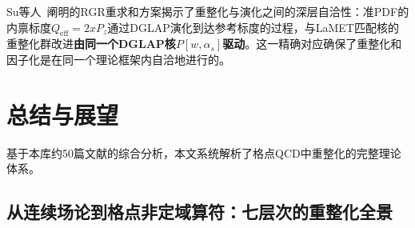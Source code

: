 \documentclass[12pt,a4paper]{ctexart}
\theoremstyle{definition}
\begin{document}
Su等人~\cite{Su2023RGR}阐明的RGR重求和方案揭示了重整化与演化之间的深层自洽性：准PDF的内禀标度$Q_{\text{eff}} = 2xP_z$通过DGLAP演化到达参考标度的过程，与LaMET匹配核的重整化群改进\textbf{由同一个DGLAP核$P[w,\alpha_s]$驱动}。这一精确对应确保了重整化和因子化是在同一个理论框架内自洽地进行的。

\section{总结与展望}

基于本库约50篇文献的综合分析，本文系统解析了格点QCD中重整化的完整理论体系。

\subsection*{从连续场论到格点非定域算符：七层次的重整化全景}
\end{document}
